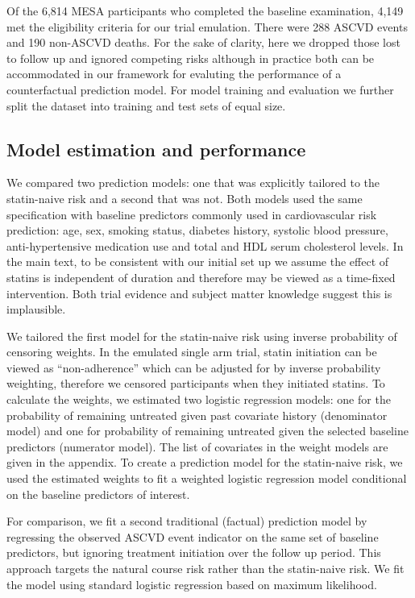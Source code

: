 Of the 6,814 MESA participants who completed the baseline examination, 4,149 met the eligibility criteria for our trial emulation. There were 288 ASCVD events and 190 non-ASCVD deaths. For the sake of clarity, here we dropped those lost to follow up and ignored competing risks although in practice both can be accommodated in our framework for evaluting the performance of a counterfactual prediction model. For model training and evaluation we further split the dataset into training and test sets of equal size. 

\subsection{Model estimation and performance}

We compared two prediction models: one that was explicitly tailored to the statin-naive risk and a second that was not. Both models used the same specification with baseline predictors commonly used in cardiovascular risk prediction: age, sex, smoking status, diabetes history, systolic blood pressure, anti-hypertensive medication use and total and HDL serum cholesterol levels. In the main text, to be consistent with our initial set up we assume the effect of statins is independent of duration and therefore may be viewed as a time-fixed intervention. Both trial evidence and subject matter knowledge suggest this is implausible.

We tailored the first model for the statin-naive risk using inverse probability of censoring weights. In the emulated single arm trial, statin initiation can be viewed as ``non-adherence'' which can be adjusted for by inverse probability weighting, therefore we censored participants when they initiated statins. To calculate the weights, we estimated two logistic regression models: one for the probability of remaining untreated given past covariate history (denominator model) and one for probability of remaining untreated given the selected baseline predictors (numerator model). The list of covariates in the weight models are given in the appendix. To create a prediction model for the statin-naive risk, we used the estimated weights to fit a weighted logistic regression model conditional on the baseline predictors of interest. 

For comparison, we fit a second traditional (factual) prediction model by regressing the observed ASCVD event indicator on the same set of baseline predictors, but ignoring treatment initiation over the follow up period. This approach targets the natural course risk rather than the statin-naive risk. We fit the model using standard logistic regression based on maximum likelihood.

